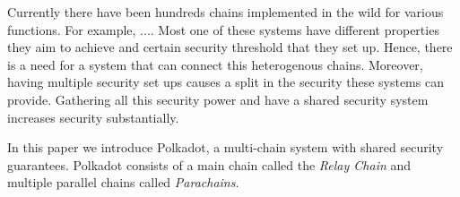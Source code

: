 Currently there have been hundreds chains implemented in the wild for various functions.
For example, ....
Most one of these systems have different properties they aim to achieve and certain security threshold that they set up. Hence, there is a need for a system that can connect this heterogenous chains.
Moreover, having multiple security set ups causes a split in the security these systems can provide.
Gathering all this security power and have a shared security system increases security substantially.

In this paper we introduce Polkadot, a multi-chain system with shared security guarantees.
Polkadot consists of a main chain called the \emph{Relay Chain} and multiple parallel chains called \emph{Parachains}.
